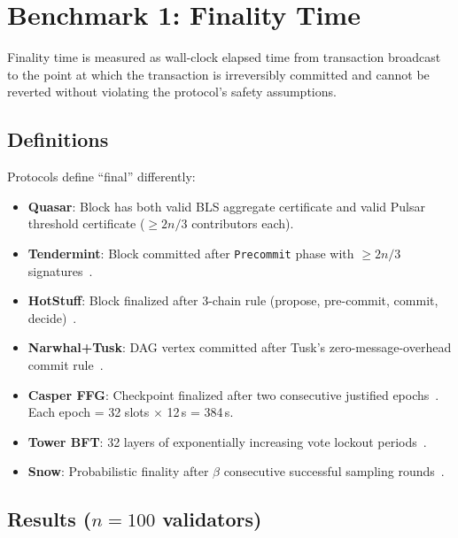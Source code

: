\section{Benchmark 1: Finality Time}

\label{sec:finality}

Finality time is measured as wall-clock elapsed time from transaction broadcast to the
point at which the transaction is irreversibly committed and cannot be reverted without
violating the protocol's safety assumptions.

\subsection{Definitions}

Protocols define ``final'' differently:
\begin{itemize}
\item \textbf{Quasar}: Block has both valid BLS aggregate certificate and valid Pulsar
      threshold certificate ($\geq 2n/3$ contributors each).
\item \textbf{Tendermint}: Block committed after \texttt{Precommit} phase with $\geq 2n/3$
      signatures~\cite{tendermint}.
\item \textbf{HotStuff}: Block finalized after 3-chain rule (propose, pre-commit,
      commit, decide)~\cite{hotstuff}.
\item \textbf{Narwhal+Tusk}: DAG vertex committed after Tusk's zero-message-overhead
      commit rule~\cite{narwhal-tusk}.
\item \textbf{Casper FFG}: Checkpoint finalized after two consecutive justified
      epochs~\cite{casper-ffg}. Each epoch = 32 slots $\times$ 12\,s = 384\,s.
\item \textbf{Tower BFT}: 32 layers of exponentially increasing vote lockout
      periods~\cite{solana-wp}.
\item \textbf{Snow}: Probabilistic finality after $\beta$ consecutive successful
      sampling rounds~\cite{snow-paper}.
\end{itemize}

\subsection{Results ($n = 100$ validators)}

